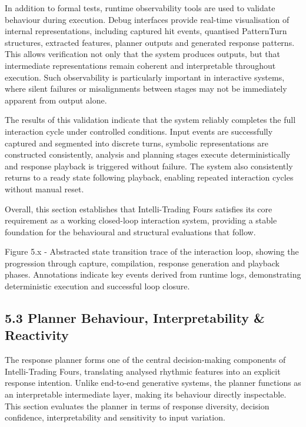 In addition to formal tests, runtime observability tools are used to
validate behaviour during execution. Debug interfaces provide real-time
visualisation of internal representations, including captured hit
events, quantised PatternTurn structures, extracted features, planner
outputs and generated response patterns. This allows verification not
only that the system produces outputs, but that intermediate
representations remain coherent and interpretable throughout execution.
Such observability is particularly important in interactive systems,
where silent failures or misalignments between stages may not be
immediately apparent from output alone.

The results of this validation indicate that the system reliably
completes the full interaction cycle under controlled conditions. Input
events are successfully captured and segmented into discrete turns,
symbolic representations are constructed consistently, analysis and
planning stages execute deterministically and response playback is
triggered without failure. The system also consistently returns to a
ready state following playback, enabling repeated interaction cycles
without manual reset.

Overall, this section establishes that Intelli-Trading Fours satisfies
its core requirement as a working closed-loop interaction system,
providing a stable foundation for the behavioural and structural
evaluations that follow.

Figure 5.x - Abstracted state transition trace of the interaction loop,
showing the progression through capture, compilation, response
generation and playback phases. Annotations indicate key events derived
from runtime logs, demonstrating deterministic execution and successful
loop closure.

\subsection{5.3 Planner Behaviour, Interpretability \&
Reactivity}\label{planner-behaviour-interpretability-reactivity}

The response planner forms one of the central decision-making components
of Intelli-Trading Fours, translating analysed rhythmic features into an
explicit response intention. Unlike end-to-end generative systems, the
planner functions as an interpretable intermediate layer, making its
behaviour directly inspectable. This section evaluates the planner in
terms of response diversity, decision confidence, interpretability and
sensitivity to input variation.

